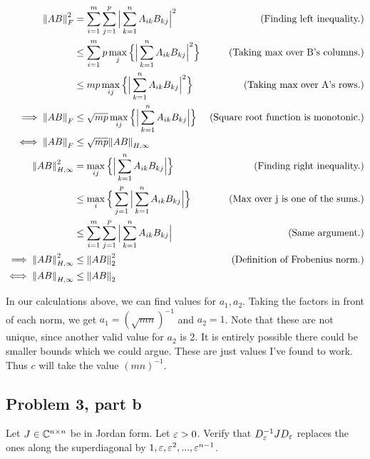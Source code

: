\begin{solution}
\begin{align}
    \norm{AB}^2_F &= \sum_{i = 1}^m\sum_{j = 1}^p\Big|\sum_{k = 1}^nA_{ik}B_{kj}\Big|^2
    &\text{(Finding left inequality.)}\nonumber\\
    &\leq \sum_{i = 1}^mp\max_j \Big\{ \Big|\sum_{k = 1}^n A_{ik}B_{kj}\Big|^2\Big\}    &\text{(Taking max over B's columns.)}\nonumber\\
    &\leq mp\max_{ij}\Big\{ \Big| \sum_{k = 1}^nA_{ik}B_{kj}\Big|^2\Big\}   &\text{(Taking max over A's rows.)}\nonumber\\
    \implies \norm{AB}_F &\leq \sqrt{mp}\max_{ij}\Big\{\Big| \sum_{k = 1}^n A_{ik}B_{kj}\Big|\Big\} &\text{(Square root function is monotonic.)}\nonumber\\
    \iff \norm{AB}_F &\leq \sqrt{mp}\norm{AB}_{H, \infty}\label{p3a: left ineq}\\
    \norm{AB}^2_{H, \infty} &= \max_{ij}\Big\{\Big| \sum_{k = 1}^n A_{ik}B_{kj}\Big|\Big\} &\text{(Finding right inequality.)}\nonumber\\
    &\leq \max_{i}\Big\{\sum_{j = 1}^p\Big| \sum_{k = 1}^n A_{ik}B_{kj}\Big|\Big\} &\text{(Max over j is one of the sums.)}\nonumber\\
    &\leq \sum_{i = 1}^m\sum_{j = 1}^p\Big| \sum_{k = 1}^n A_{ik}B_{kj}\Big| &\text{(Same argument.)}\nonumber\\
    \implies \norm{AB}^2_{H, \infty} &\leq \norm{AB}_2^2 &\text{(Definition of Frobenius norm.)}\nonumber\\
    \iff \norm{AB}_{H, \infty} &\leq \norm{AB}_2\label{p3a: right ineq}
\end{align}

\alignbreak

In our calculations above, we can find values for $a_1, a_2$. Taking the factors in front of each norm, we get $a_1 = (\sqrt{mn})^{-1}$ and $a_2 = 1$. Note that these are not unique, since another valid value for $a_2$ is 2. It is entirely possible there could be smaller bounds which we could argue. These are just values I've found to work.  Thus $c$ will take the value $(mn)^{-1}$.

\newpage
\subsection{Problem 3, part b}
Let $J \in \mathbb{C}^{n\times n}$ be in Jordan form. Let $\varepsilon > 0$. Verify that $D^{-1}_\varepsilon J D_\varepsilon$ replaces the ones along the superdiagonal by $1, \varepsilon, \varepsilon^2, ..., \varepsilon^{n - 1}$.
\partbreak


\end{solution}
